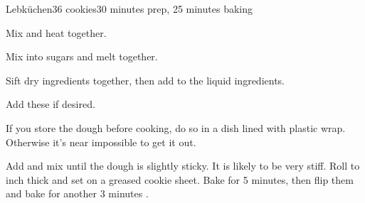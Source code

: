 \documentclass[../Cookbook.tex]{subfiles}
\begin{document}
\begin{recipe}{Lebk\"uchen}{36 cookies}{30 minutes prep, 25 minutes baking}


	Mix and heat together.

	Mix into sugars and melt together.

	Sift dry ingredients together, then add to the liquid ingredients.

	Add these if desired.

	If you store the dough before cooking, do so in a dish lined with plastic wrap.
	Otherwise it's near impossible to get it out.

	Add and mix until the dough is slightly sticky. It is likely to be very stiff. Roll to  inch thick and set on a greased cookie sheet. Bake for
	5 minutes, then flip them and bake for another 3 minutes%
	.

\end{recipe}
\end{document}
